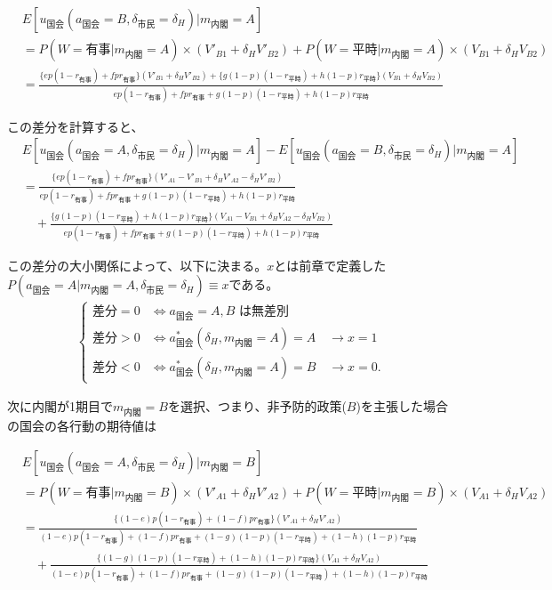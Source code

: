 \documentclass[main.tex]{subfiles}
\begin{document}
\begin{align*}
    & E[u_{国会}(a_{国会}=B, \delta_{市民}=\delta_H) | m_{内閣} = A  ]\\[0.5em]
    &= P(W=有事 | m_{内閣}=A) × (V'_{B1} + \delta_H V'_{B2}) + P(W=平時 | m_{内閣}=A) × (V_{B1} + \delta_H V_{B2})\\[0.5em]
    &= \frac{ \{ep(1-r_{有事}) +  fpr_{有事}\}(V'_{B1} + \delta_H V'_{B2}) +  \{g(1-p)(1-r_{平時}) + h(1-p)r_{平時}\}(V_{B1} + \delta_H V_{B2})  }{ ep(1-r_{有事}) + fpr_{有事} + g(1-p)(1-r_{平時}) + h(1-p)r_{平時} }
\end{align*}

\bigskip
この差分を計算すると、
\begin{align*}
    & E[u_{国会}(a_{国会}=A, \delta_{市民}=\delta_H) | m_{内閣} = A  ] - E[u_{国会}(a_{国会}=B, \delta_{市民}=\delta_H) | m_{内閣} = A  ]\\[1em]
    &= \frac{ \{ep(1-r_{有事}) +  fpr_{有事}\}(V'_{A1} -V'_{B1} + \delta_H V'_{A2} - \delta_H V'_{B2})  }{ ep(1-r_{有事}) + fpr_{有事} + g(1-p)(1-r_{平時}) + h(1-p)r_{平時} }\\[1em]
    &\quad + \frac{ \{g(1-p)(1-r_{平時}) + h(1-p)r_{平時}\}(V_{A1} - V_{B1} + \delta_H V_{A2} - \delta_H V_{B2} ) }{ ep(1-r_{有事}) + fpr_{有事} + g(1-p)(1-r_{平時}) + h(1-p)r_{平時} }
\end{align*}

\bigskip
この差分の大小関係によって、以下に決まる。$x$とは前章で定義した\\
$P(a_{国会} = A| m_{内閣} = A, \delta_{市民} = \delta_H ) \equiv x$である。
\begin{align*}
    \begin{cases}
         \text{差分} = 0 &\Leftrightarrow \text{$a_{\text{国会}} = A, B$ は無差別} \\
         \text{差分} > 0 &\Leftrightarrow a^*_{\text{国会}}(\delta_H, m_{\text{内閣}} = A) = A \quad\rightarrow x = 1 \\
         \text{差分} < 0 &\Leftrightarrow a^*_{\text{国会}}(\delta_H, m_{\text{内閣}} = A) = B \quad\rightarrow x = 0.
    \end{cases}
\end{align*}





\bigskip
次に内閣が1期目で$m_{内閣}=B$を選択、つまり、非予防的政策($B$)を主張した場合の国会の各行動の期待値は

\begin{align*}
    & E[u_{国会}(a_{国会}=A, \delta_{市民}=\delta_H) | m_{内閣} = B  ]\\[0.5em]
    &= P(W=有事 | m_{内閣}=B) × (V'_{A1} + \delta_H V'_{A2}) + P(W=平時 | m_{内閣}=B) × (V_{A1} + \delta_H V_{A2})\\[0.5em]
    &= \frac{ \{(1-e)p(1-r_{有事}) +  (1-f)pr_{有事}\}(V'_{A1} + \delta_H V'_{A2}) }{ (1-e)p(1-r_{有事}) + (1-f)pr_{有事} + (1-g)(1-p)(1-r_{平時}) + (1-h)(1-p)r_{平時} }\\[1em]
    &\quad + \frac{ \{(1-g)(1-p)(1-r_{平時}) + (1-h)(1-p)r_{平時}\}(V_{A1} + \delta_H V_{A2}) }{ (1-e)p(1-r_{有事}) + (1-f)pr_{有事} + (1-g)(1-p)(1-r_{平時}) + (1-h)(1-p)r_{平時} }
\end{align*}
\end{document}
